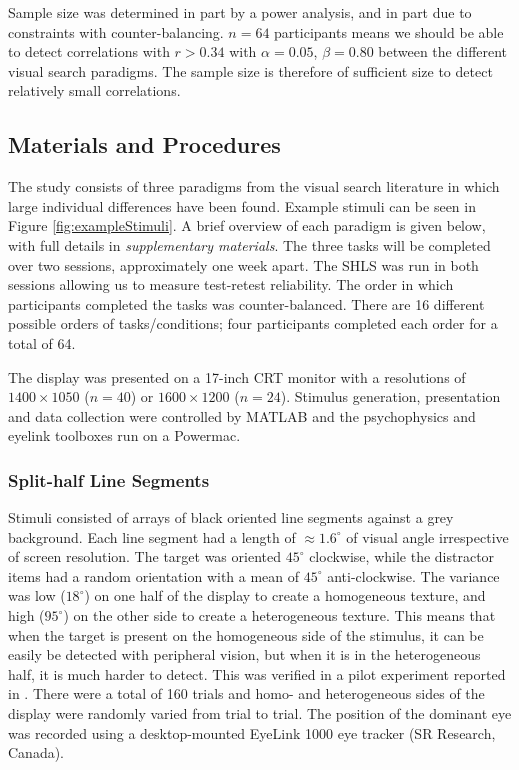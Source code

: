 \documentclass[]{rsos}%
\begin{document}
Sample size was determined in part by a power analysis, and in part due to constraints with counter-balancing. $n = 64$ participants means we should be able to detect correlations with $r > 0.34$ with $\alpha = 0.05$, $\beta = 0.80$ between the different visual search paradigms. The sample size is therefore of sufficient size to detect relatively small correlations.

\subsection{Materials and Procedures}

The study consists of three paradigms from the visual search literature in which large individual differences have been  found\cite{nowakowska2017, irons-leber2016, kristjansson2014}. Example stimuli can be seen in Figure \ref{fig:exampleStimuli}. A brief overview of each paradigm is given below, with full details in \textit{supplementary materials}. The three tasks will be completed over two sessions, approximately one week apart. The SHLS was run in both sessions allowing us to measure test-retest reliability. The order in which participants completed the tasks was counter-balanced. There are 16 different possible orders of tasks/conditions; four participants completed each order for a total of 64.

The display was presented on a 17-inch CRT monitor with a resolutions of $1400 \times 1050$ ($n = 40$) or $1600 \times 1200$ ($n = 24$). Stimulus generation, presentation and data collection were controlled by MATLAB and the psychophysics and eyelink toolboxes \cite{brainard1997,cornelissen2002} run on a Powermac. 

\subsubsection{Split-half Line Segments}

Stimuli consisted of arrays of black oriented line segments against a grey background. Each line segment had a length of $\approx$$1.6^{\circ}$ of visual angle irrespective of screen resolution. The target was oriented $45^{\circ}$ clockwise, while the distractor items had a random orientation with a mean of $45^{\circ}$ anti-clockwise. The variance was low ($18^{\circ}$) on one half of the display to create a homogeneous texture, and high ($95^{\circ}$) on the other side to create a heterogeneous texture. This means that when the target is present on the homogeneous side of the stimulus, it can be easily be detected with peripheral vision, but when it is in the heterogeneous half, it is much harder to detect. This was verified in a pilot experiment reported in \cite{nowakowska2017}.  There were a total of 160 trials and homo- and heterogeneous sides of the display were randomly varied from trial to trial. The position of the dominant eye was recorded using a desktop-mounted EyeLink 1000 eye tracker (SR Research, Canada). 
\end{document}
